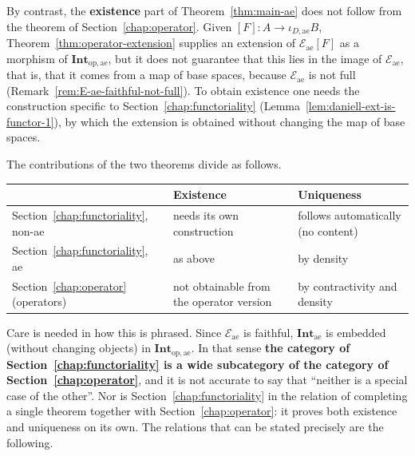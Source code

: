 \begin{remark}\label{rem:two-chapters-relation}
  By contrast, the \textbf{existence} part of
  Theorem~\ref{thm:main-ae} does not follow from the theorem of
  Section~\ref{chap:operator}.
  Given $[F]:A\to\iota_{D,\mathrm{ae}}B$,
  Theorem~\ref{thm:operator-extension} supplies an extension of
  $\mathcal{E}_{\mathrm{ae}}[F]$ as a morphism of
  $\mathbf{Int}_{\mathrm{op},\mathrm{ae}}$, but it does not guarantee that this
  lies in the image of $\mathcal{E}_{\mathrm{ae}}$, that is, that it comes from
  a map of base spaces, because $\mathcal{E}_{\mathrm{ae}}$ is not full
  (Remark~\ref{rem:E-ae-faithful-not-full}).
  To obtain existence one needs the construction specific to
  Section~\ref{chap:functoriality}
  (Lemma~\ref{lem:daniell-ext-is-functor-1}), by which the extension is
  obtained without changing the map of base spaces.

  The contributions of the two theorems divide as follows.

  \begin{center}
  \begin{tabular}{@{}lll@{}}
    \toprule
     & Existence & Uniqueness \\
    \midrule
    Section~\ref{chap:functoriality}, non-ae & needs its own construction & follows automatically (no content) \\
    Section~\ref{chap:functoriality}, ae & as above & by density \\
    Section~\ref{chap:operator} (operators) & not obtainable from the operator version & by contractivity and density \\
    \bottomrule
  \end{tabular}
  \end{center}

  Care is needed in how this is phrased.
  Since $\mathcal{E}_{\mathrm{ae}}$ is faithful,
  $\mathbf{Int}_{\mathrm{ae}}$ is embedded (without changing objects) in
  $\mathbf{Int}_{\mathrm{op},\mathrm{ae}}$.
  In that sense \textbf{the category of
  Section~\ref{chap:functoriality} is a wide subcategory of the category of
  Section~\ref{chap:operator}}, and it is not accurate to say that ``neither is
  a special case of the other''.
  Nor is Section~\ref{chap:functoriality} in the relation of completing a single
  theorem together with Section~\ref{chap:operator}: it proves both existence
  and uniqueness on its own.
  The relations that can be stated precisely are the following.


\end{remark}
